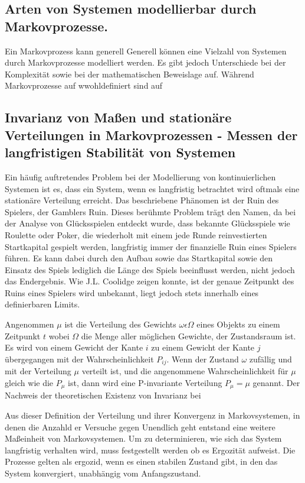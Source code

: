 \subsection{Arten von Systemen modellierbar durch Markovprozesse.}

Ein Markovprozess kann generell 
Generell können eine Vielzahl von Systemen durch Markovprozesse modelliert werden. Es gibt jedoch Unterschiede bei der Komplexität sowie bei der mathematischen Beweislage auf. Während Markovprozesse auf wwohldefiniert sind auf

\subsection{Invarianz von Maßen und stationäre Verteilungen in Markovprozessen - Messen der langfristigen Stabilität von Systemen}

Ein häufig auftretendes Problem bei der Modellierung von kontinuierlichen Systemen ist es, dass ein System, wenn es langfristig betrachtet wird oftmals eine stationäre Verteilung erreicht. Das beschriebene Phänomen ist der Ruin des Spielers, der Gamblers Ruin. Dieses berühmte Problem trägt den Namen, da bei der Analyse von Glücksspielen entdeckt wurde, dass bekannte Glücksspiele wie Roulette oder Poker, die wiederholt mit einem jede Runde reinvestierten Startkapital gespielt werden, langfristig immer der finanzielle Ruin eines Spielers führen. Es kann dabei durch den Aufbau sowie das Startkapital sowie den Einsatz des Spiels lediglich die Länge des Spiels beeinflusst werden, nicht jedoch das Endergebnis. Wie J.L. Coolidge zeigen konnte, ist der genaue Zeitpunkt des Ruins eines Spielers wird unbekannt, liegt jedoch stets innerhalb eines definierbaren Limits. \citep{coolidge1909gamblers}

Angenommen $\mu$ ist die Verteilung des Gewichts $\omega\epsilon\Omega$ eines Objekts zu einem Zeitpunkt $t$ wobei $\Omega$ die Menge aller möglichen Gewichte, der Zustandsraum ist. Es wird von einem Gewicht der Kante $i$ zu einem Gewicht der Kante $j$ übergegangen mit der Wahrscheinlichkeit $P_{ij}$.
Wenn der Zustand $\omega$ zufällig und mit der Verteilung $\mu$ verteilt ist, und die angenommene Wahrscheinlichkeit für $\mu$ gleich wie die $P_\mu$ ist, dann wird eine P-invariante Verteilung $P_\mu = \mu$ genannt. Der Nachweis der theoretischen Existenz von Invarianz bei  \citep{Lester1966}

Aus dieser Definition der Verteilung und ihrer Konvergenz in Markovsystemen, in denen die Anzahld er Versuche gegen Unendlich geht entstand eine weitere Maßeinheit von Markovsystemen. Um zu determinieren, wie sich das System langfristig verhalten wird, muss festgestellt werden ob es Ergozität aufweist. Die Prozesse gelten als ergozid, wenn es einen stabilen Zustand gibt, in den das System konvergiert, unabhängig vom Anfangszustand. \cite{MeynTweedie1993}

